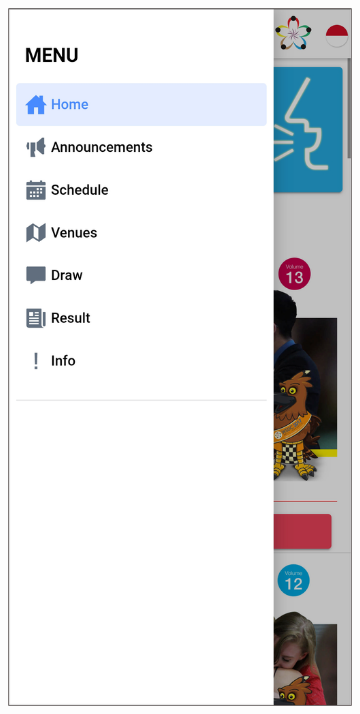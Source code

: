 \begin{figure}[H]
     \centering
     \begin{subfigure}[b]{0.3\textwidth}
         \centering
         \includegraphics[width=\textwidth]{Gambar/SSSidebar.png}

\end{subfigure}
\end{figure}
